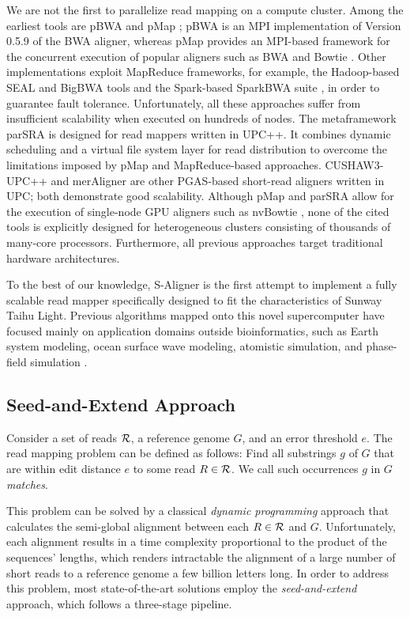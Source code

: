 We are not the first to parallelize read mapping on a compute
cluster. Among the earliest tools are pBWA \cite{pbwa} and pMap
\cite{pmap}; pBWA is an MPI implementation of Version 0.5.9 of the BWA
aligner, whereas pMap provides an MPI-based framework for the concurrent
execution of popular aligners such as BWA \cite{bwa} and Bowtie
\cite{bowtie}. Other implementations exploit MapReduce frameworks, for
example, the Hadoop-based SEAL \cite{seal} and BigBWA \cite{bigbwa}
tools and the Spark-based SparkBWA suite \cite{sparkBWA}, in order to
guarantee fault tolerance. Unfortunately, all these approaches suffer
from insufficient scalability when executed on hundreds of nodes. The
metaframework parSRA \cite{parSRA} is designed for read mappers
written in UPC++.  It combines dynamic scheduling and a virtual file
system layer for read distribution to overcome the limitations imposed
by pMap and MapReduce-based approaches.
CUSHAW3-UPC++ \cite{cushaw3upc}
and merAligner \cite{merAligner}
are other PGAS-based short-read
aligners written in UPC; both demonstrate good scalability. Although
pMap and parSRA allow for the execution of single-node GPU aligners
such as nvBowtie \cite{nvBio}, none of the cited tools is explicitly
designed for heterogeneous clusters consisting of thousands of
many-core processors. Furthermore, all previous approaches target
traditional hardware architectures.

To the best of our knowledge, S-Aligner is the first attempt to
implement a fully scalable read mapper specifically designed to fit
the characteristics of Sunway Taihu Light. Previous algorithms mapped
onto this novel supercomputer have focused mainly on application
domains outside bioinformatics, such as Earth system modeling, ocean
surface wave modeling, atomistic simulation, and phase-field
simulation \cite{sunway}.

\subsection{Seed-and-Extend Approach}

Consider a set of reads ${\cal R}$, a reference genome $G$, and an
error threshold $e$. The read mapping problem can be defined as
follows: Find all substrings $g$ of $G$ that are within edit distance
$e$ to some read $R \in {\cal R}$. We call such occurrences $g$ in $G$
{\em matches}.

This problem can be solved by a classical {\em dynamic programming}
approach that calculates the semi-global alignment between each
$R \in {\cal R}$ and $G$. Unfortunately, each alignment results in a
time complexity proportional to the product of the sequences' lengths,
which renders intractable the alignment of a large number of short
reads to a reference genome a few billion letters long.  In order to
address this problem, most state-of-the-art solutions \cite{Reinert}
employ the {\em seed-and-extend} approach, which follows a three-stage
pipeline.


